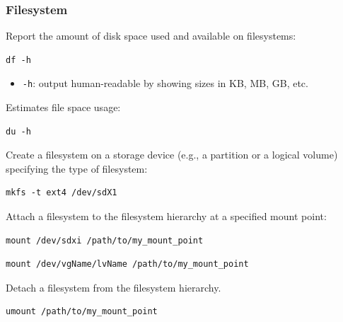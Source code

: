 \documentclass{article}
\newenvironment{codetemplate}[1][]{%
  \mybasecolorbox[#1]
  \itshape
}{%
  \endmybasecolorbox
}
\begin{document}
\subsubsection{Filesystem}
Report the amount of disk space used and available on filesystems:
\begin{codetemplate}
\begin{verbatim}
df -h
\end{verbatim}
\end{codetemplate}

\begin{itemize}
    \item \verb|-h|: output human-readable by showing sizes in KB, MB, GB, etc.
\end{itemize}

Estimates file space usage:
\begin{codetemplate}
\begin{verbatim}
du -h
\end{verbatim}
\end{codetemplate}

Create a filesystem on a storage device (e.g., a partition or a logical volume) specifying the type of filesystem:
\begin{codetemplate}
\begin{verbatim}
mkfs -t ext4 /dev/sdX1
\end{verbatim}
\end{codetemplate}

Attach a filesystem to the filesystem hierarchy at a specified mount point:
\begin{codetemplate}
\begin{verbatim}
mount /dev/sdxi /path/to/my_mount_point
\end{verbatim}
\end{codetemplate}

\begin{codetemplate}
\begin{verbatim}
mount /dev/vgName/lvName /path/to/my_mount_point
\end{verbatim}
\end{codetemplate}

Detach a filesystem from the filesystem hierarchy.

\begin{codetemplate}
\begin{verbatim}
umount /path/to/my_mount_point
\end{verbatim}
\end{codetemplate}
\end{document}
